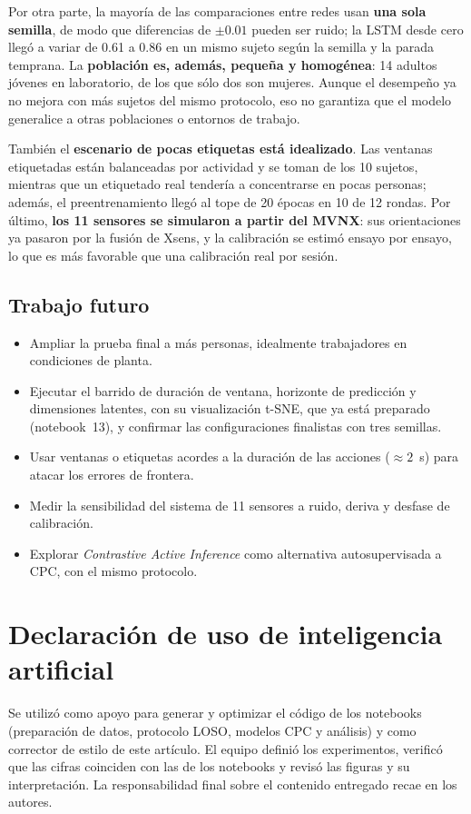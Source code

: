 \documentclass[letterpaper,11pt]{article}
\begin{document}
Por otra parte, la mayoría de las comparaciones entre redes usan \textbf{una sola semilla}, de modo que diferencias de $\pm 0.01$ pueden ser ruido; la LSTM desde cero llegó a variar de 0.61 a 0.86 en un mismo sujeto según la semilla y la parada temprana. La \textbf{población es, además, pequeña y homogénea}: 14 adultos jóvenes en laboratorio, de los que sólo dos son mujeres. Aunque el desempeño ya no mejora con más sujetos del mismo protocolo, eso no garantiza que el modelo generalice a otras poblaciones o entornos de trabajo.

También el \textbf{escenario de pocas etiquetas está idealizado}. Las ventanas etiquetadas están balanceadas por actividad y se toman de los 10 sujetos, mientras que un etiquetado real tendería a concentrarse en pocas personas; además, el preentrenamiento llegó al tope de 20 épocas en 10 de 12 rondas. Por último, \textbf{los 11 sensores se simularon a partir del MVNX}: sus orientaciones ya pasaron por la fusión de Xsens, y la calibración se estimó ensayo por ensayo, lo que es más favorable que una calibración real por sesión.

\subsection{Trabajo futuro}
\begin{itemize}
  \item Ampliar la prueba final a más personas, idealmente trabajadores en condiciones de planta.
  \item Ejecutar el barrido de duración de ventana, horizonte de predicción y dimensiones latentes, con su visualización t-SNE, que ya está preparado (notebook~13), y confirmar las configuraciones finalistas con tres semillas.
  \item Usar ventanas o etiquetas acordes a la duración de las acciones ($\approx 2$~s) para atacar los errores de frontera.
  \item Medir la sensibilidad del sistema de 11 sensores a ruido, deriva y desfase de calibración.
  \item Explorar \emph{Contrastive Active Inference} \parencite{mazzaglia2021} como alternativa autosupervisada a CPC, con el mismo protocolo.
\end{itemize}

\section*{Declaración de uso de inteligencia artificial}
Se utilizó \textcite{anthropic2026claude} como apoyo para generar y optimizar el código de los notebooks (preparación de datos, protocolo LOSO, modelos CPC y análisis) y como corrector de estilo de este artículo. El equipo definió los experimentos, verificó que las cifras coinciden con las de los notebooks y revisó las figuras y su interpretación. La responsabilidad final sobre el contenido entregado recae en los autores.
\end{document}
